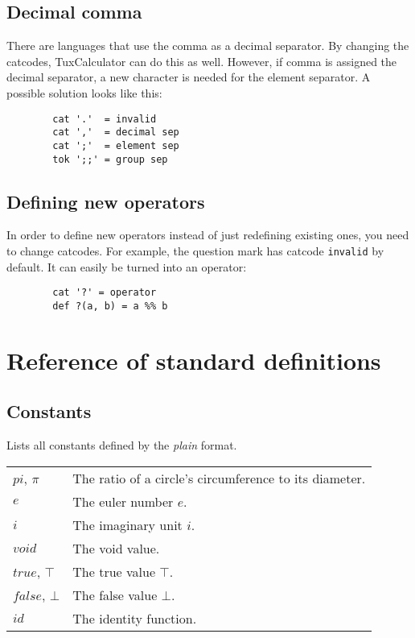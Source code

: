 \documentclass[10pt]{article}
\begin{document}
    \subsection{Decimal comma}\label{subsec:decimal-comma}
    There are languages that use the comma as a decimal separator.
    By changing the catcodes, TuxCalculator can do this as well.
    However, if comma is assigned the decimal separator, a new character is needed for the element separator.
    A possible solution looks like this:
    \begin{verbatim}
        cat '.'  = invalid
        cat ','  = decimal sep
        cat ';'  = element sep
        tok ';;' = group sep
    \end{verbatim}
    
    \subsection{Defining new operators}\label{subsec:new-operators}
    In order to define new operators instead of just redefining existing ones, you need to change catcodes.
    For example, the question mark has catcode \verb|invalid| by default.
    It can easily be turned into an operator:
    \begin{verbatim}
        cat '?' = operator
        def ?(a, b) = a %% b
    \end{verbatim}

    \section{Reference of standard definitions}\label{sec:reference-def}

    \subsection{Constants}
    Lists all constants defined by the \textit{plain} format.
    \begin{longtable}{p{}p{}}
        $ pi $, $ \pi $    & The ratio of a circle's circumference to its diameter. \\
        $ e $               & The euler number $ e $. \\
        $ i $               & The imaginary unit $ i $. \\
        $ void $            & The void value. \\
        $ true $, $ \top $  & The true value $ \top $. \\
        $ false $, $ \bot $ & The false value $ \bot $. \\
        $ id $              & The identity function. \\
    \end{longtable}
    
\end{document}
